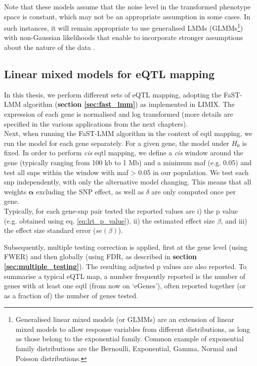 Note that these models assume that the noise level in the transformed phenotype space is constant, which may not be an appropriate assumption in some cases. 
In such instances, it will remain appropriate to use generalised LMMs (GLMMs\footnote{Generalised linear mixed models (or GLMMs) are an extension of linear mixed models to allow response variables from different distributions, as long as those belong to the exponential family.
Common example of exponential family distributions are the Bernoulli, Exponential, Gamma, Normal and Poisson distributions.}) with non-Gaussian likelihoods that enable to incorporate stronger assumptions about the nature of the data \cite{fusi2014warped, lee2011estimating}. 


\newpage

\subsection{Linear mixed models for eQTL mapping}
\label{sec:lmm_eqtl}

In this thesis, we perform different sets of eQTL mapping, adopting the FaST-LMM algorithm (\textbf{section \ref{sec:fast_lmm}}) as implemented in LIMIX.
The expression of each gene is normalised and log transformed (more details are specified in the various applications from the next chapters). \\

Next, when running the FaST-LMM algorithm in the context of \gls{eqtl} mapping, we run the model for each gene separately.
For a given gene, the model under $H_0$ is fixed.
In order to perform \textit{cis} \gls{eqtl} mapping, we define a \textit{cis} window around the gene (typically ranging from 100 kb to 1 Mb) and a minimum \gls{maf} (e.g. 0.05) and test all \gls{snp}s within the window with \gls{maf} > 0.05 in our population.  
We test each \gls{snp} independently, with only the alternative model changing.
This means that all weights $\boldsymbol{\alpha}$ excluding the SNP effect, as well as $\delta$ are only computed once per gene.\\

Typically, for each gene-\gls{snp} pair tested the reported values are i) the p value (e.g. obtained using eq. \eqref{eq:lrt_p_value}), ii) the estimated effect size $\beta$, and iii) the effect size standard error ($se(\beta)$).

Subsequently, multiple testing correction is applied, first at the gene level (using FWER) and then globally (using FDR, as described in \textbf{section \ref{sec:multiple_testing}}).
The resulting adjusted p values are also reported.
To summarise a typical eQTL map, a number frequently reported is the number of genes with at least one \gls{eqtl} (from now on `eGenes'), often reported together (or as a fraction of) the number of genes tested. \\

